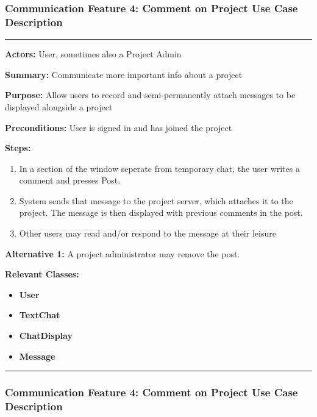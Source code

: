 \documentclass[twoside,letterpaper]{article}
\begin{document}
	\subsubsection[Communication Feature 4: Comment on Project Use Case Description]{\rmfamily\bfseries\color{black}
		Communication Feature 4: Comment on Project Use Case Description}
	\hypertarget{RefHeading22059017292}{}
	
	\vspace{2pt}
	\hrule
	\vspace{8pt}
	\textbf{Actors:} User, sometimes also a Project Admin \newline
	
	\noindent\textbf{Summary:} Communicate more important info about a project  \newline
	
	\noindent\textbf{Purpose:} Allow users to record and semi-permanently attach messages to be displayed alongside a project \newline
	
	\noindent\textbf{Preconditions:} User is signed in and has joined the project \newline
	
	\noindent\textbf{Steps:} \begin{enumerate}
		\item In a section of the window seperate from temporary chat, the user writes a comment and presses Post.
		\item System sends that message to the project server, which attaches it to the project. The message is then displayed with previous comments in the post.
		\item Other users may read and/or respond to the message at their leisure
	\end{enumerate}
	\noindent\textbf{Alternative 1:} A project administrator may remove the post. \newline
	
	
	\noindent\textbf{Relevant Classes:}
	\begin{itemize}
		\item \textbf{User}
		\item \textbf{TextChat}
		\item \textbf{ChatDisplay}
		\item \textbf{Message}
	\end{itemize}
	\hrule
	\newpage
	
	
	\subsubsection[Communication Feature 5: Close chat Use Case Description]{\rmfamily\bfseries\color{black}
		Communication Feature 4: Comment on Project Use Case Description}
	\hypertarget{RefHeading22059017292}{}
	
\end{document}
